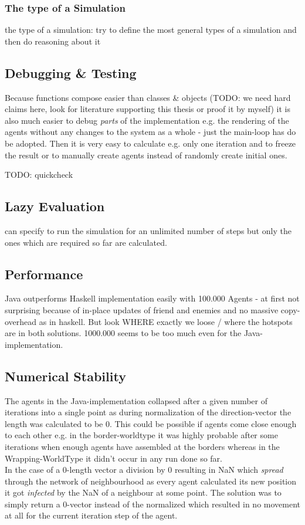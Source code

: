 \subsubsection{The type of a Simulation}
the type of a simulation: try to define the most general types of a simulation and then do reasoning about it

\subsection{Debugging \& Testing}
Because functions compose easier than classes \& objects (TODO: we need hard claims here, look for literature supporting this thesis or proof it by myself) it is also much easier to debug \textit{parts} of the implementation e.g. the rendering of the agents without any changes to the system as a whole - just the main-loop has do be adopted. Then it is very easy to calculate e.g. only one iteration and to freeze the result or to manually create agents instead of randomly create initial ones.

TODO: quickcheck \cite{claessen_quickcheck:_2000}


\subsection{Lazy Evaluation}
can specify to run the simulation for an unlimited number of steps but only the ones which are required so far are calculated.

\subsection{Performance}
Java outperforms Haskell implementation easily with 100.000 Agents - at first not surprising because of in-place updates of friend and enemies and no massive copy-overhead as in haskell. But look WHERE exactly we loose / where the hotspots are in both solutions. 1000.000 seems to be too much even for the Java-implementation.

\subsection{Numerical Stability}
The agents in the Java-implementation collapsed after a given number of iterations into a single point as during normalization of the direction-vector the length was calculated to be 0. This could be possible if agents come close enough to each other e.g. in the border-worldtype it was highly probable after some iterations when enough agents have assembled at the borders whereas in the Wrapping-WorldType it didn't occur in any run done so far. \\
In the case of a 0-length vector a division by 0  resulting in NaN which \textit{spread} through the network of neighbourhood as every agent calculated its new position it got \textit{infected} by the NaN of a neighbour at some point. The solution was to simply return a 0-vector instead of the normalized which resulted in no movement at all for the current iteration step of the agent. 


